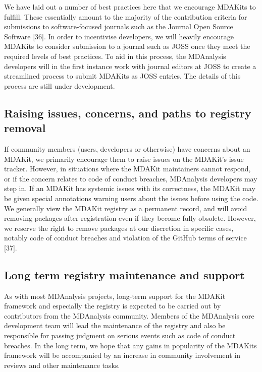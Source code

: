 \documentclass{article}
\begin{document}
We have laid out a number of best practices here that we encourage MDAKits to fulfill. These essentially amount to the majority of the contribution criteria for submissions to software-focused journals such as the Journal Open Source Software [36]. In order to incentivise developers, we will heavily encourage MDAKits to consider submission to a journal such as JOSS once they meet the required levels of best practices. To aid in this process, the MDAnalysis developers will in the first instance work with journal editors at JOSS to create a streamlined process to submit MDAKits as JOSS entries. The details of this process are still under development.

\subsection{Raising issues, concerns, and paths to registry removal}

If community members (users, developers or otherwise) have concerns about an MDAKit, we primarily encourage them to raise issues on the MDAKit’s issue tracker. However, in situations where the MDAKit maintainers cannot respond, or if the concern relates to code of conduct breaches, MDAnalysis developers may step in. If an MDAKit has systemic issues with its correctness, the MDAKit may be given special annotations warning users about the issues before using the code. We generally view the MDAKit registry as a permanent record, and will avoid removing packages after registration even if they become fully obsolete. However, we reserve the right to remove packages at our discretion in specific cases, notably code of conduct breaches and violation of the GitHub terms of service [37].

\subsection{Long term registry maintenance and support}

As with most MDAnalysis projects, long-term support for the MDAKit framework and especially the registry is expected to be carried out by contributors from the MDAnalysis community. Members of the MDAnalysis core development team will lead the maintenance of the registry and also be responsible for passing judgment on serious events such as code of conduct breaches. In the long term, we hope that any gains in popularity of the MDAKits framework will be accompanied by an increase in community involvement in reviews and other maintenance tasks.
\end{document}
